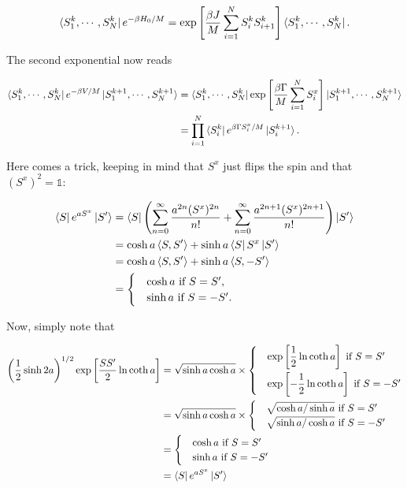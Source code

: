 \documentclass[11pt,openany]{article}
\begin{document}
\begin{equation}
	\bra{S^k_1,\cdots,S^k_N}e^{-\beta H_0/M} = \exp\left[\frac{\beta J}{M}\sum_{i=1}^N S_i^k S_{i+1}^k\right]\bra{S^k_1,\cdots,S^k_N}.
\end{equation}

The second exponential now reads

\begin{align*}
	\bra{S^k_1,\cdots,S^k_N}e^{-\beta V/M}\ket{S^{k+1}_1,\cdots,S^{k+1}_N} &= \bra{S^k_1,\cdots,S^k_N}\exp\left[\frac{\beta\Gamma}{M}\sum_{i=1}^N S_i^x\right]\ket{S^{k+1}_1,\cdots,S^{k+1}_N}\\
	&= \prod_{i=1}^N\bra{S_i^k}e^{\beta\Gamma S_i^x/M}\ket{S_i^{k+1}}.
\end{align*}

Here comes a trick, keeping in mind that $S^x$ just flips the spin and that $(S^x)^2=\mathds{1}$:

\begin{align*}
	\bra{S}e^{aS^x}\ket{S'} &= \bra{S}\left(\sum_{n=0}^\infty\frac{a^{2n}(S^x)^{2n}}{n!} + \sum_{n=0}^\infty\frac{a^{2n+1}(S^x)^{2n+1}}{n!}\right)\ket{S'}\\
	&= \cosh{a}\braket{S,S'} + \sinh{a}\bra{S}S^x\ket{S'}\\
	&= \cosh{a}\braket{S,S'} + \sinh{a}\braket{S,-S'}\\
	&= \begin{cases}
		&\cosh{a} \text{ if } S=S',\\
		&\sinh{a} \text{ if } S=-S'.
	\end{cases}
\end{align*}

Now, simply note that

\begin{align*}
	\left(\frac{1}{2}\sinh{2a}\right)^{1/2}\exp\left[\frac{SS'}{2}\ln\coth{a}\right] &= \sqrt{\sinh{a}\cosh{a}}\times
		\begin{cases}
			&\exp\left[\dfrac{1}{2}\ln\coth{a}\right] \text{ if } S=S'			\vspace{1mm}\\
			&\exp\left[-\dfrac{1}{2}\ln\coth{a}\right] \text{ if } S=-S'
		\end{cases}\\
	& = \sqrt{\sinh{a}\cosh{a}}\times
	\begin{cases}
		&\sqrt{\cosh{a}/\sinh{a}} \text{ if } S=S'\\
		&\sqrt{\sinh{a}/\cosh{a}} \text{ if } S=-S'
	\end{cases}\\
	&= \begin{cases}
		&\cosh{a} \text{ if } S=S'\\
		&\sinh{a} \text{ if } S=-S'
	\end{cases}\\
	&= \bra{S}e^{aS^x}\ket{S'}
\end{align*}
\end{document}
